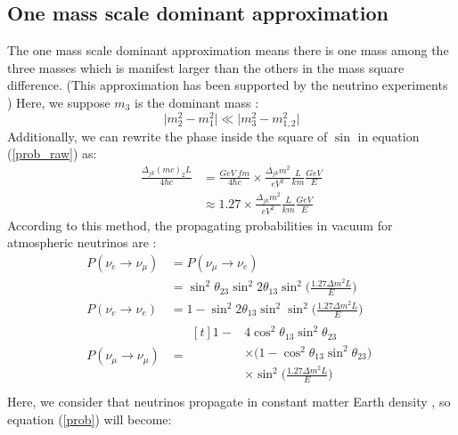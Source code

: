 \documentclass[12pt]{article}
\begin{document}
\begin{multicols}{2}
        \subsection{One mass scale dominant approximation}
        The one mass scale dominant approximation means there is one mass among the three masses which is manifest larger than the others in the mass square difference. (This approximation has been supported by the neutrino experiments \cite{SKexp}) Here, we suppose $m_3$ is the dominant mass :
        \[
            \big| m_{2}^{2} - m_{1}^{2} \big| \ll \big| m_{3}^{2} - m_{1,2}^{2} \big|
        \]
        Additionally, we can rewrite the phase inside the square of $\sin$ in equation (\ref{prob_raw}) as:
        \begin{align*}
            \frac{\Delta_{jk}(mc)_{2}L}{4 \hbar c} &= \frac{GeV\ fm}{4 \hbar c} \times \frac{\Delta_{jk} m^2}{eV^2} \frac{L}{km} \frac{GeV}{E}\\
            &\approx 1.27 \times \frac{\Delta_{jk} m^2}{eV^2} \frac{L}{km} \frac{GeV}{E}
        \end{align*}
        According to this method, the propagating probabilities in vacuum for atmospheric neutrinos are \cite{SKexp} : 
        \begin{align*}
                P(\nu_{e} \rightarrow \nu_{\mu})    &= P(\nu_{\mu}\rightarrow \nu_{e})\\
                                                    &= \sin^{2}\theta_{23} \sin^{2} 2\theta_{13} \sin^{2}\Big( \frac{1.27 \Delta m^{2} L}{E} \Big) \tag{II}\label{prob} \\
                P(\nu_{e} \rightarrow \nu_{e})      &= 1 - \sin^{2} 2\theta_{13}\sin^{2} \sin^{2}\Big( \frac{1.27\Delta m^{2} L}{E} \Big)\\ 
                P(\nu_{\mu} \rightarrow \nu_{\mu})  &= \begin{aligned}[t]
                                                            1 - &4 \cos^{2}\theta_{13}\sin^{2}\theta_{23}\\
                                                                &\times \big( 1 - \cos^{2}\theta_{13}\sin^{2} \theta_{23} \big)\\
                                                                &\times \sin^{2}\Big( \frac{1.27\Delta m^{2} L}{E} \Big)\\
                                                        \end{aligned}
        \end{align*}
        Here, we consider that neutrinos propagate in constant matter Earth density \cite{SKexp}, so equation (\ref{prob}) will become:

\end{multicols}
\end{document}
